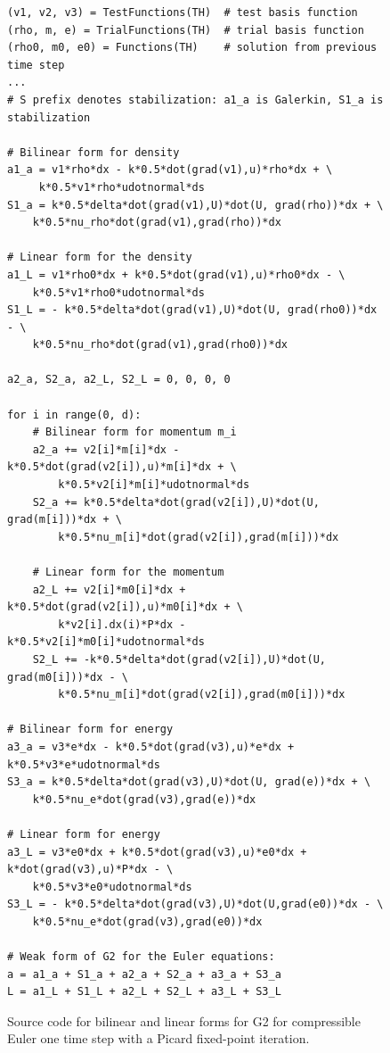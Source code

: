 \begin{figure}[!h]
\begin{lstlisting}
(v1, v2, v3) = TestFunctions(TH)  # test basis function
(rho, m, e) = TrialFunctions(TH)  # trial basis function
(rho0, m0, e0) = Functions(TH)    # solution from previous time step
...
# S prefix denotes stabilization: a1_a is Galerkin, S1_a is stabilization

# Bilinear form for density
a1_a = v1*rho*dx - k*0.5*dot(grad(v1),u)*rho*dx + \
     k*0.5*v1*rho*udotnormal*ds
S1_a = k*0.5*delta*dot(grad(v1),U)*dot(U, grad(rho))*dx + \
    k*0.5*nu_rho*dot(grad(v1),grad(rho))*dx 

# Linear form for the density
a1_L = v1*rho0*dx + k*0.5*dot(grad(v1),u)*rho0*dx - \
    k*0.5*v1*rho0*udotnormal*ds
S1_L = - k*0.5*delta*dot(grad(v1),U)*dot(U, grad(rho0))*dx - \
    k*0.5*nu_rho*dot(grad(v1),grad(rho0))*dx 

a2_a, S2_a, a2_L, S2_L = 0, 0, 0, 0

for i in range(0, d):
    # Bilinear form for momentum m_i
    a2_a += v2[i]*m[i]*dx - k*0.5*dot(grad(v2[i]),u)*m[i]*dx + \
        k*0.5*v2[i]*m[i]*udotnormal*ds
    S2_a += k*0.5*delta*dot(grad(v2[i]),U)*dot(U, grad(m[i]))*dx + \
        k*0.5*nu_m[i]*dot(grad(v2[i]),grad(m[i]))*dx

    # Linear form for the momentum
    a2_L += v2[i]*m0[i]*dx + k*0.5*dot(grad(v2[i]),u)*m0[i]*dx + \
        k*v2[i].dx(i)*P*dx - k*0.5*v2[i]*m0[i]*udotnormal*ds
    S2_L += -k*0.5*delta*dot(grad(v2[i]),U)*dot(U, grad(m0[i]))*dx - \
        k*0.5*nu_m[i]*dot(grad(v2[i]),grad(m0[i]))*dx 

# Bilinear form for energy
a3_a = v3*e*dx - k*0.5*dot(grad(v3),u)*e*dx + k*0.5*v3*e*udotnormal*ds
S3_a = k*0.5*delta*dot(grad(v3),U)*dot(U, grad(e))*dx + \
    k*0.5*nu_e*dot(grad(v3),grad(e))*dx

# Linear form for energy
a3_L = v3*e0*dx + k*0.5*dot(grad(v3),u)*e0*dx + k*dot(grad(v3),u)*P*dx - \
    k*0.5*v3*e0*udotnormal*ds
S3_L = - k*0.5*delta*dot(grad(v3),U)*dot(U,grad(e0))*dx - \
    k*0.5*nu_e*dot(grad(v3),grad(e0))*dx 

# Weak form of G2 for the Euler equations:
a = a1_a + S1_a + a2_a + S2_a + a3_a + S3_a
L = a1_L + S1_L + a2_L + S2_L + a3_L + S3_L
\end{lstlisting}
\caption{
Source code for bilinear and linear forms for G2 for compressible Euler one
time step with a Picard fixed-point iteration.  }
\label{code:form_compressible}
\end{figure}


